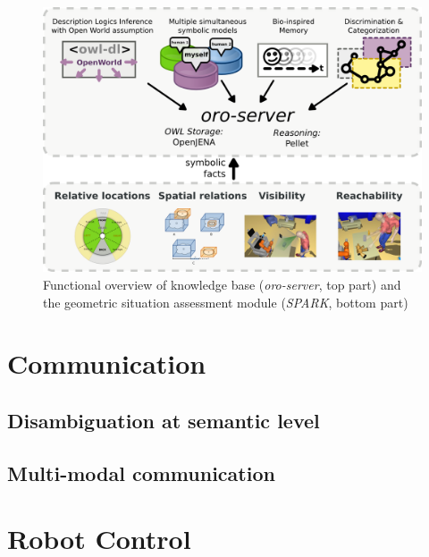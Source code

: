 \documentclass[letterpaper, 10 pt, conference]{ieeeconf}  %
\begin{document}
\begin{figure}
        \centering
        \includegraphics[width=\columnwidth]{spark-oro}
        \caption{Functional overview of knowledge base (\emph{oro-server}, top part) and the geometric situation assessment module (\emph{SPARK}, bottom part)}
        \label{fig|spark-oro}
\end{figure}

\cite{Sisbot2011}

\section{Communication}
\label{sect|com}

\cite{Lemaignan2011a}

\subsection{Disambiguation at semantic level}

\cite{Ros2010b}


\subsection{Multi-modal communication}

\section{Robot Control}
\label{sect|ctrl}
\end{document}
